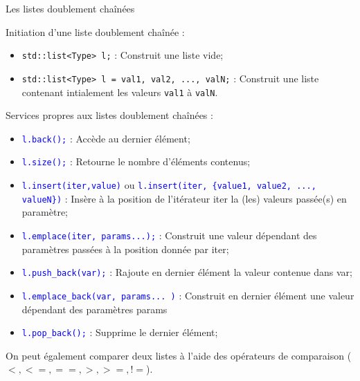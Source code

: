 \documentclass[compress,10pt,aspectratio=169]{beamer}
\begin{document}
\begin{frame}[fragile]{Les listes doublement chaînées}
\scriptsize
  
Initiation d'une liste doublement chaînée :
\begin{itemize}
\item \texttt{std::list<Type> l;} : Construit une liste vide;
\item \texttt{std::list<Type> l = {val1, val2, ..., valN};} : Construit une liste contenant intialement les valeurs \texttt{val1} à \texttt{valN}.
\end{itemize}
  
Services propres aux listes doublement chaînées :
\begin{itemize}
\item \textcolor{blue}{\texttt{l.back();}} : Accède au dernier élément;
\item \textcolor{blue}{\texttt{l.size();}} : Retourne le nombre d'éléments contenus;
\item \textcolor{blue}{\texttt{l.insert(iter,value)}} ou \textcolor{blue}{\texttt{l.insert(iter, \{value1, value2, ..., valueN\})}} :
Insère à la position de l'itérateur iter la (les) valeurs passée(s) en paramètre;
\item \textcolor{blue}{\texttt{l.emplace(iter, params...);}} : Construit une valeur dépendant des paramètres passées à la position donnée par iter;
\item \textcolor{blue}{\texttt{l.push\_back(var);}} : Rajoute en dernier élément la valeur contenue dans var;
\item \textcolor{blue}{\texttt{l.emplace\_back(var, params... )}} : Construit en dernier élément une valeur dépendant des paramètres params
\item \textcolor{blue}{\texttt{l.pop\_back();}} : Supprime le dernier élément;
\end{itemize}
  
On peut également comparer deux listes à l'aide des opérateurs de comparaison ($<,<=,==,>,>=,!=$).
\end{frame}
\end{document}
